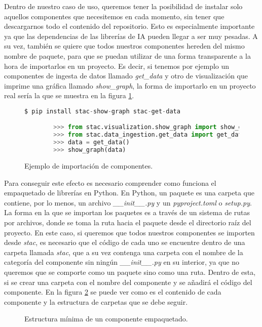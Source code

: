 Dentro de nuestro caso de uso, queremos tener la posibilidad de instalar
solo aquellos componentes que necesitemos en cada momento, sin tener que
descargarnos todo el contenido del repositorio. Esto es especialmente 
importante ya que las dependencias de las librerías de IA pueden llegar a
ser muy pesadas. A su vez, también se quiere que todos nuestros componentes
hereden del mismo nombre de paquete, para que se puedan utilizar de una forma
transparente a la hora de importarlos en un proyecto. Es decir, si tenemos por
ejemplo un componentes de ingesta de datos llamado \textit{get\_data} y otro de 
visualización que imprime una gráfica llamado \textit{show\_graph}, la forma de 
importarlo en un proyecto real sería la que se muestra en la figura \ref{fig:import-components}.

\begin{figure}[!h]
    \begin{lstlisting}[language=Python]
        $ pip install stac-show-graph stac-get-data

        >>> from stac.visualization.show_graph import show_graph
        >>> from stac.data_ingestion.get_data import get_data
        >>> data = get_data()
        >>> show_graph(data)
    \end{lstlisting}
    \caption{Ejemplo de importación de componentes.}
    \label{fig:import-components}
\end{figure}

Para conseguir este efecto es necesario comprender como funciona el empaquetado
de librerías en Python. En Python, un paquete es una carpeta que contiene, por lo menos,
un archivo \textit{\_\_init\_\_.py} y un \textit{pyproject.toml} o \textit{setup.py}. 
La forma en la que se importan los paquetes es a través de un sistema de rutas por archivos, 
donde se toma la ruta hacia el paquete desde el directorio raíz del proyecto. En este caso,
si queremos que todos nuestros componentes se importen desde \textit{stac}, es necesario que
el código de cada uno se encuentre dentro de una carpeta llamada \textit{stac}, que a su vez
contenga una carpeta con el nombre de la categoría del componente sin ningún \textit{\_\_init\_\_.py} 
en su interior, ya que no queremos que se comporte como un paquete sino como una ruta.
Dentro de esta, si se crear una carpeta con el nombre del componente y se añadirá el código 
del componente. En la figura \ref{fig:min-package} se puede ver 
como es el contenido de cada componente y la estructura de carpetas que se debe seguir.\medskip 

\begin{figure}[!h]
    \caption{Estructura mínima de un componente empaquetado.}
    \label{fig:min-package}
\end{figure}

